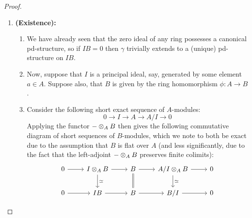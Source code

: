                     \begin{proof}
                        \noindent
                        \begin{enumerate}
                            \item \textbf{(Existence):} 
                                \noindent
                                \begin{enumerate}
                                    \item We have already seen that the zero ideal of any ring possesses a canonical pd-structure, so if $IB = 0$ then $\gamma$ trivially extends to a (unique) pd-structure on $IB$.
                                    \item Now, suppose that $I$ is a principal ideal, say, generated by some element $a \in A$. Suppose also, that $B$ is given by the ring homomorphism $\phi: A \to B$.
                                    \item Consider the following short exact sequence of $A$-modules:
                                        $$0 \to I \to A \to A/I \to 0$$
                                    Applying the functor $- \tensor_A B$ then gives the following commutative diagram of short sequences of $B$-modules, which we note to both be exact due to the assumption that $B$ is flat over $A$ (and less significantly, due to the fact that the left-adjoint $- \tensor_A B$ preserves finite colimits):
                                        $$
                                            \begin{tikzcd}
                                            	{0} & {I \tensor_A B} & {B} & {A/I \tensor_A B} & {0} \\
                                            	{0} & {IB} & {B} & {B/I} & {0}
                                            	\arrow["{\cong}", from=1-2, to=2-2]
                                            	\arrow[Rightarrow, from=1-3, to=2-3, no head]
                                            	\arrow["{\cong}", from=1-4, to=2-4]
                                            	\arrow[from=1-2, to=1-3]
                                            	\arrow[from=1-3, to=1-4]
                                            	\arrow[from=2-2, to=2-3]
                                            	\arrow[from=2-3, to=2-4]
                                            	\arrow[from=2-4, to=2-5]
                                            	\arrow[from=1-4, to=1-5]
                                            	\arrow[from=1-1, to=1-2]
                                            	\arrow[from=2-1, to=2-2]
                                            \end{tikzcd}
                                        $$
                                    

\end{enumerate}
\end{enumerate}
\end{proof}
